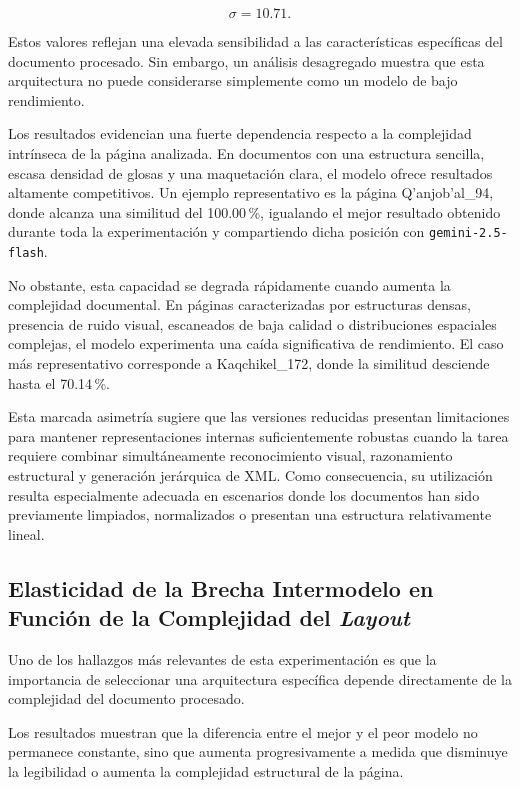 \[
\sigma = 10.71.
\]

Estos valores reflejan una elevada sensibilidad a las características específicas del documento procesado. Sin embargo, un análisis desagregado muestra que esta arquitectura no puede considerarse simplemente como un modelo de bajo rendimiento.

Los resultados evidencian una fuerte dependencia respecto a la complejidad intrínseca de la página analizada. En documentos con una estructura sencilla, escasa densidad de glosas y una maquetación clara, el modelo ofrece resultados altamente competitivos. Un ejemplo representativo es la página Q'anjob'al\_94, donde alcanza una similitud del 100.00\,\%, igualando el mejor resultado obtenido durante toda la experimentación y compartiendo dicha posición con \texttt{gemini-2.5-flash}.

No obstante, esta capacidad se degrada rápidamente cuando aumenta la complejidad documental. En páginas caracterizadas por estructuras densas, presencia de ruido visual, escaneados de baja calidad o distribuciones espaciales complejas, el modelo experimenta una caída significativa de rendimiento. El caso más representativo corresponde a Kaqchikel\_172, donde la similitud desciende hasta el 70.14\,\%.

Esta marcada asimetría sugiere que las versiones reducidas presentan limitaciones para mantener representaciones internas suficientemente robustas cuando la tarea requiere combinar simultáneamente reconocimiento visual, razonamiento estructural y generación jerárquica de XML. Como consecuencia, su utilización resulta especialmente adecuada en escenarios donde los documentos han sido previamente limpiados, normalizados o presentan una estructura relativamente lineal.

\subsection{Elasticidad de la Brecha Intermodelo en Función de la Complejidad del \textit{Layout}}

Uno de los hallazgos más relevantes de esta experimentación es que la importancia de seleccionar una arquitectura específica depende directamente de la complejidad del documento procesado.

Los resultados muestran que la diferencia entre el mejor y el peor modelo no permanece constante, sino que aumenta progresivamente a medida que disminuye la legibilidad o aumenta la complejidad estructural de la página.

